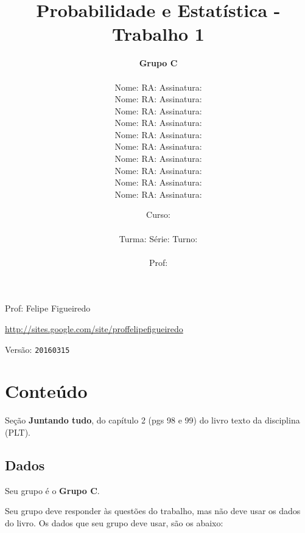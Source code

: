 \documentclass[a4paper]{article}
\date{
\bigskip
Curso: \underline{\hspace{8cm}}\\
\ \\
Turma: \underline{\hspace{1cm}} Série: \underline{\hspace{1cm}} Turno:
\underline{\hspace{1cm}}\\
\ \\
Prof: \underline{\hspace{8cm}}\\
}
\title{Probabilidade e Estatística - Trabalho 1}
\author{
{\bf Grupo C}\\
\ \\
Nome: \underline{\hspace{6cm}} RA: \underline{\hspace{2cm}} Assinatura: \underline{\hspace{4cm}}\\
Nome: \underline{\hspace{6cm}} RA: \underline{\hspace{2cm}} Assinatura: \underline{\hspace{4cm}}\\
Nome: \underline{\hspace{6cm}} RA: \underline{\hspace{2cm}} Assinatura: \underline{\hspace{4cm}}\\
Nome: \underline{\hspace{6cm}} RA: \underline{\hspace{2cm}} Assinatura: \underline{\hspace{4cm}}\\
Nome: \underline{\hspace{6cm}} RA: \underline{\hspace{2cm}} Assinatura: \underline{\hspace{4cm}}\\
Nome: \underline{\hspace{6cm}} RA: \underline{\hspace{2cm}} Assinatura: \underline{\hspace{4cm}}\\
Nome: \underline{\hspace{6cm}} RA: \underline{\hspace{2cm}} Assinatura: \underline{\hspace{4cm}}\\
Nome: \underline{\hspace{6cm}} RA: \underline{\hspace{2cm}} Assinatura: \underline{\hspace{4cm}}\\
Nome: \underline{\hspace{6cm}} RA: \underline{\hspace{2cm}} Assinatura: \underline{\hspace{4cm}}\\
Nome: \underline{\hspace{6cm}} RA: \underline{\hspace{2cm}} Assinatura: \underline{\hspace{4cm}}\\
}
\begin{document}
\maketitle
\newpage

\parbox[c]{.825\textwidth}{\raggedright%
{Prof: Felipe Figueiredo\par}
{\url{http://sites.google.com/site/proffelipefigueiredo}\par}
}

Versão: \verb|20160315|




\section{Conteúdo}

Seção {\bf Juntando tudo}, do capítulo 2 (pgs 98 e 99) do livro texto da disciplina (PLT). 

\subsection{Dados}
Seu grupo é o {\bf Grupo C}.

Seu grupo deve responder às questões do trabalho, mas não deve usar os dados do livro. Os dados que seu grupo deve usar, são os abaixo:
\end{document}
